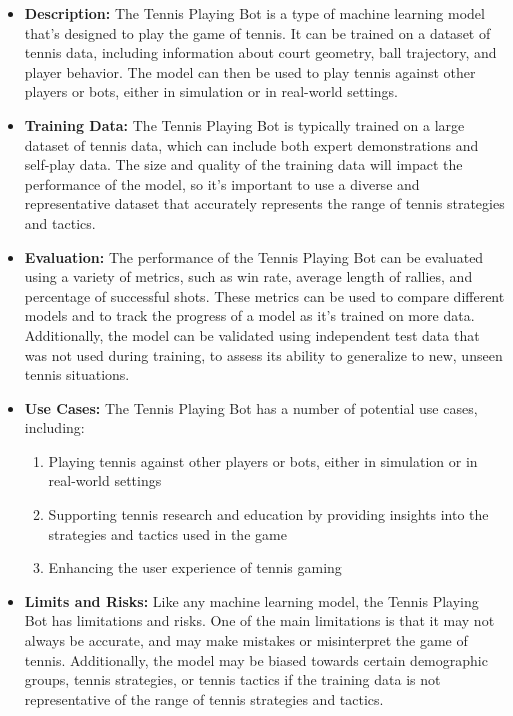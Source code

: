 \begin{itemize}
    \item \textbf{Description:} The Tennis Playing Bot is a type of machine learning model that's designed to play the game of tennis. It can be trained on a dataset of tennis data, including information about court geometry, ball trajectory, and player behavior. The model can then be used to play tennis against other players or bots, either in simulation or in real-world settings.
    \item \textbf{Training Data:} The Tennis Playing Bot is typically trained on a large dataset of tennis data, which can include both expert demonstrations and self-play data. The size and quality of the training data will impact the performance of the model, so it's important to use a diverse and representative dataset that accurately represents the range of tennis strategies and tactics.
    \item \textbf{Evaluation:} The performance of the Tennis Playing Bot can be evaluated using a variety of metrics, such as win rate, average length of rallies, and percentage of successful shots. These metrics can be used to compare different models and to track the progress of a model as it's trained on more data. Additionally, the model can be validated using independent test data that was not used during training, to assess its ability to generalize to new, unseen tennis situations.
    \item \textbf{Use Cases:} The Tennis Playing Bot has a number of potential use cases, including:
        \begin{enumerate}  
            \item Playing tennis against other players or bots, either in simulation or in real-world settings
            \item Supporting tennis research and education by providing insights into the strategies and tactics used in the game
            \item Enhancing the user experience of tennis gaming
        \end{enumerate}
    \item \textbf{Limits and Risks:} Like any machine learning model, the Tennis Playing Bot has limitations and risks. One of the main limitations is that it may not always be accurate, and may make mistakes or misinterpret the game of tennis. Additionally, the model may be biased towards certain demographic groups, tennis strategies, or tennis tactics if the training data is not representative of the range of tennis strategies and tactics.

\end{itemize}
